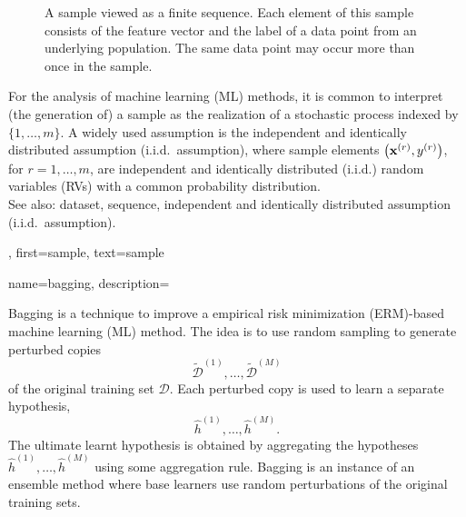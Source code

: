 {{{\begin{figure}
\begin{center}
 		\end{center}
 		\caption{A sample viewed as a finite sequence. 
		         Each element of this sample consists of the feature vector 
				 and the label of a data point from an underlying population.
				The same data point may occur more than once in the sample. 
 			\label{fig:sample-sequence_dict}}
 	\end{figure} 	
 	For the analysis of machine learning (ML) methods, it is common to interpret (the generation of) a 
	sample as the realization of a stochastic process indexed by $\{1,\ldots,m\}$. 
	A widely used assumption is the independent and identically distributed assumption (i.i.d.\ assumption), where sample elements 
	$\left( {\bf x}^{(r)},y^{(r)} \right)$, 
	for $r=1,\ldots,m$, are independent and identically distributed (i.i.d.) random variables (RVs) with a common probability distribution.  \\
 See also: dataset, sequence, independent and identically distributed assumption (i.i.d.\ assumption).},
 first={sample},
 text={sample}
}



{name={bagging},
	description={Bagging is a technique to improve a empirical risk minimization (ERM)-based machine learning (ML) 
	     method. The idea is to use random sampling 
		to generate perturbed copies $$\widetilde{\mathcal{D}}^{(1)},\ldots,\widetilde{\mathcal{D}}^{(M)}$$
		of the original training set $\mathcal{D}$. Each perturbed copy is used to learn 
		a separate hypothesis, 
		$$\hat{h}^{(1)},\ldots,\hat{h}^{(M)}.$$
		The ultimate learnt hypothesis is obtained by aggregating the  
		hypotheses $\hat{h}^{(1)},\ldots,\hat{h}^{(M)}$ 
		using some aggregation rule. Bagging is an instance of an ensemble method 
		where base learners use random perturbations of the original training sets.
		\begin{figure}[htbp]
		\begin{center}
		\begin{tikzpicture}[
		scale=1.0, transform shape,
		node distance=10mm and 10mm,
		dataset/.style={draw, rounded corners, inner sep=2pt},
		learner/.style={draw, rounded corners, minimum width=14mm, minimum height=7mm, inner sep=2pt},
		op/.style={draw, circle, inner sep=1pt},
		>=latex
		]
		

\end{tikzpicture}
\end{center}
\end{figure}}}}
